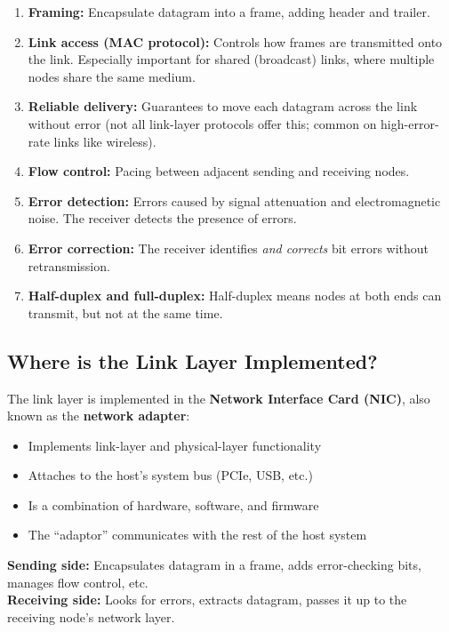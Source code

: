 \begin{keybox}
\begin{enumerate}[noitemsep]
    \item \textbf{Framing:} Encapsulate datagram into a frame, adding header and trailer.
    \item \textbf{Link access (MAC protocol):} Controls how frames are transmitted onto the link. Especially important for shared (broadcast) links, where multiple nodes share the same medium.
    \item \textbf{Reliable delivery:} Guarantees to move each datagram across the link without error (not all link-layer protocols offer this; common on high-error-rate links like wireless).
    \item \textbf{Flow control:} Pacing between adjacent sending and receiving nodes.
    \item \textbf{Error detection:} Errors caused by signal attenuation and electromagnetic noise. The receiver detects the presence of errors.
    \item \textbf{Error correction:} The receiver identifies \emph{and corrects} bit errors without retransmission.
    \item \textbf{Half-duplex and full-duplex:} Half-duplex means nodes at both ends can transmit, but not at the same time.
\end{enumerate}
\end{keybox}

\begin{imagebox}
\end{imagebox}

\subsection{Where is the Link Layer Implemented?}

\begin{keybox}
The link layer is implemented in the \textbf{Network Interface Card (NIC)}, also known as the \textbf{network adapter}:
\begin{itemize}[noitemsep]
    \item Implements link-layer and physical-layer functionality
    \item Attaches to the host's system bus (PCIe, USB, etc.)
    \item Is a combination of hardware, software, and firmware
    \item The ``adaptor'' communicates with the rest of the host system
\end{itemize}

\medskip
\textbf{Sending side:} Encapsulates datagram in a frame, adds error-checking bits, manages flow control, etc.\\
\textbf{Receiving side:} Looks for errors, extracts datagram, passes it up to the receiving node's network layer.
\end{keybox}

